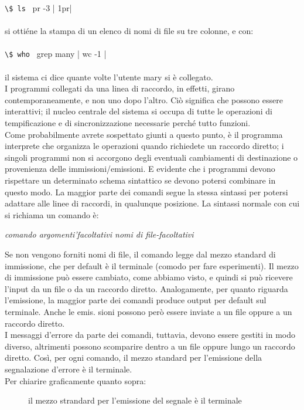 \lstinline|\$ ls | pr -3 | 1pr|\\\\
si ottiéne la stampa di un elenco di nomi di file su tre colonne, e con:\\\\
\lstinline|\$ who | grep many | wc -1 |\\\\
il sistema ci dice quante volte l'utente mary si è collegato.\\
I programmi collegati da una linea di raccordo, in effetti, girano contemporaneamente, e non uno dopo l'altro. Ciò significa che possono essere interattivi; il nucleo
centrale del sistema si occupa di tutte le operazioni di tempificazione e di sincronizzazione necessarie perché tutto funzioni.\\
Come probabilmente avrete sospettato giunti a questo punto, è il programma interprete che organizza le operazioni quando richiedete un raccordo diretto; i singoli
programmi non si accorgono degli eventuali cambiamenti di destinazione o provenienza delle immissioni/emissioni. E evidente che i programmi devono rispettare un
determinato schema sintattico se devono potersi combinare in questo modo. La maggior parte dei comandi segue la stessa sintassi per potersi adattare alle linee di raccordi, in qualunque posizione. La sintassi normale con cui si richiama un comando è:
\begin{multicols}{2}
	{\it comando argomenti'facoltativi nomi di file-facoltativi}\\
\end{multicols}
Se non vengono forniti nomi di file, il comando legge dal mezzo standard di immissione, che per default è il terminale (comodo per fare esperimenti). Il mezzo di immissione può essere cambiato, come abbiamo visto, e quindi si può ricevere l'input da un
file o da un raccordo diretto. Analogamente, per quanto riguarda l'emissione, la
maggior parte dei comandi produce output per default sul terminale. Anche le emis.
sioni possono però essere inviate a un file oppure a un raccordo diretto.\\
I messaggi d'errore da parte dei comandi, tuttavia, devono essere gestiti in modo
diverso, altrimenti possono scomparire dentro a un file oppure lungo un raccordo diretto. Così, per ogni comando, il mezzo standard per l'emissione della segnalazione d'errore è il terminale.\\
Per chiarire graficamente quanto sopra:
\begin{figure}[!ht]
	\centering
	\caption{il mezzo strandard per l'emissione del segnale è il terminale}
\end{figure}

